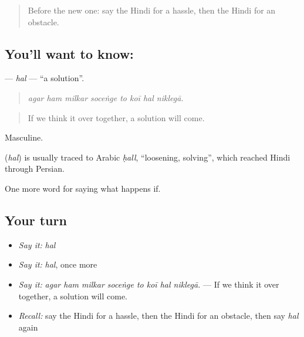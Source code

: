 \label{lesson:HI-C380-hal}



\begin{quote}
Before the new one: say the Hindi for a hassle, then the Hindi for an obstacle.
\end{quote}

\subsection*{You'll want to know: }
\textbf{} — \emph{hal} — \textquotedblleft{}a solution\textquotedblright{}.

\begin{quote}
       
\end{quote}

\begin{quote}
\emph{agar ham milkar soceṅge to koī hal niklegā.}
\end{quote}

\begin{quote}
If we think it over together, a solution will come.
\end{quote}

Masculine.

\begin{cousinweb}
\textbf{} (\emph{hal}) is usually traced to Arabic \emph{ḥall}, \textquotedblleft{}loosening, solving\textquotedblright{}, which reached Hindi through Persian.
\end{cousinweb}

\begin{grammarlens}[title={What you've built}]
One more word for saying what happens if.
\end{grammarlens}

\subsection*{Your turn}
\begin{itemize}
\raggedright
  \item \emph{Say it:} \emph{hal}
  \item \emph{Say it:} \emph{hal}, once more
  \item \emph{Say it:} \emph{agar ham milkar soceṅge to koī hal niklegā.} — If we think it over together, a solution will come.
  \item \emph{Recall:} say the Hindi for a hassle, then the Hindi for an obstacle, then say \emph{hal} again
\end{itemize}

